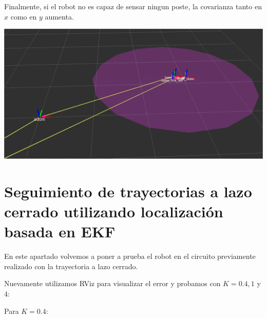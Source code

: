 Finalmente, si el robot no es capaz de sensar ningun poste, la covarianza tanto en $x$ como en $y$ aumenta.

\includegraphics[scale=0.3]{punto4/ekfSinVerNingunPoste.png}


\section{Seguimiento de trayectorias a lazo cerrado utilizando localización basada en EKF}

En este apartado volvemos a poner a prueba el robot en el circuito previamente realizado con la trayectoria a lazo cerrado.

Nuevamente utilizamos RViz para visualizar el error y probamos con $K= 0.4,1$ y $4$:

Para $K=0.4$:

